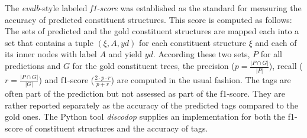 \documentclass[../document.tex]{subfiles}
\begin{document}
    The \emph{evalb}-style labeled \emph{f1-score} \citep{Black91,Col97} was established as the standard for measuring the accuracy of predicted constituent structures.
    This score is computed as follows:
    The sets of predicted and the gold constituent structures are mapped each into a set that contains a tuple \((\xi, A, \mathit{yd})\) for each constituent structure \(\xi\) and each of its inner nodes with label \(A\) and yield \(\mathit{yd}\).
    According these two sets, \(P\) for all predictions and \(G\) for the gold constituent trees, the precision (\(p = \frac{|P \cap G|}{|P|}\)), recall (\(r = \frac{|P \cap G|}{|G|}\)) and f1-score (\(\frac{2\cdot p\cdot r}{p + r}\)) are computed in the usual fashion.
    The  tags are often part of the prediction but not assessed as part of the f1-score.
    They are rather reported separately as the accuracy of the predicted  tags compared to the gold ones.
    The Python tool \emph{discodop} supplies an implementation for both the f1-score of constituent structures and the accuracy of  tags. \citep{CraSchBod16}
\end{document}
